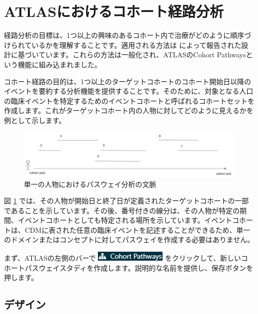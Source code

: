 \documentclass[
  11pt]{book}
\theoremstyle{definition}
\theoremstyle{definition}
\theoremstyle{definition}
\theoremstyle{definition}
\theoremstyle{remark}
\begin{document}
\section{ATLASにおけるコホート経路分析}\label{atlasux306bux304aux3051ux308bux30b3ux30dbux30fcux30c8ux7d4cux8defux5206ux6790}

経路分析の目標は、1つ以上の興味のあるコホート内で治療がどのように順序づけられているかを理解することです。適用される方法は \citet{Hripcsak7329} によって報告された設計に基づいています。これらの方法は一般化され、ATLASのCohort Pathwaysという機能に組み込まれました。

コホート経路の目的は、1つ以上のターゲットコホートのコホート開始日以降のイベントを要約する分析機能を提供することです。そのために、対象となる人口の臨床イベントを特定するためのイベントコホートと呼ばれるコホートセットを作成します。これがターゲットコホート内の人物に対してどのように見えるかを例として示します。

\begin{figure}

{\centering \includegraphics[width=1\linewidth]{images/Characterization/pathwaysPersonEventView} 

}

\caption{単一の人物におけるパスウェイ分析の文脈}\label{fig:pathwaysPersonEventView}
\end{figure}

図 \ref{fig:pathwaysPersonEventView} では、その人物が開始日と終了日が定義されたターゲットコホートの一部であることを示しています。その後、番号付きの線分は、その人物が特定の期間、イベントコホートとしても特定される場所を示しています。イベントコホートは、CDMに表された任意の臨床イベントを記述することができるため、単一のドメインまたはコンセプトに対してパスウェイを作成する必要はありません。

まず、ATLASの左側のバーで \includegraphics{images/Characterization/atlasPathwaysMenuItem.png} をクリックして、新しいコホートパスウェイスタディを作成します。説明的な名前を提供し、保存ボタンを押します。

\subsection{デザイン}\label{ux30c7ux30b6ux30a4ux30f3-1}
\end{document}
